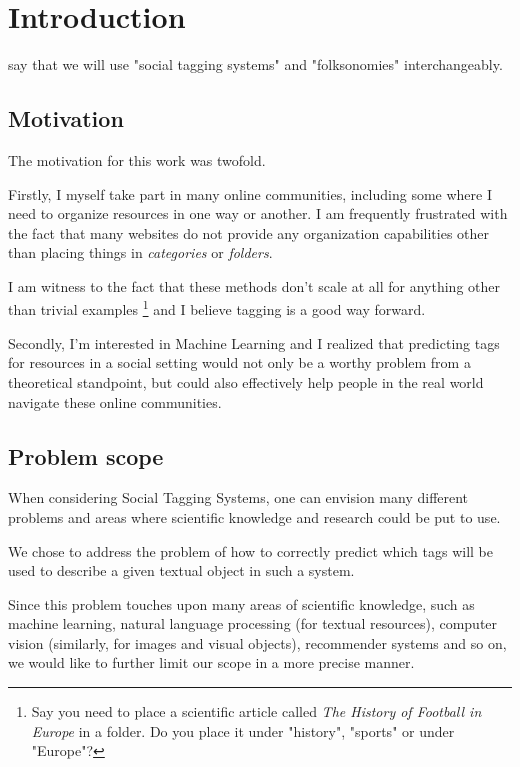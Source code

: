\chapter{Introduction}\label{chap:intro}

say that we will use "social tagging systems" and "folksonomies" interchangeably.

\section{Motivation}\label{section:intro_motivation}

The motivation for this work was twofold. 

Firstly, I myself take part in many online communities, including some where I need to organize resources in one way or another. I am frequently frustrated with the fact that many websites do not provide any organization capabilities other than placing things in \textit{categories} or \textit{folders}.

I am witness to the fact that these methods don't scale at all for anything other than trivial examples \footnote{Say you need to place a scientific article called \textit{The History of Football in Europe} in a folder. Do you place it under "history", "sports" or under "Europe"?} and I believe tagging is a good way forward.

Secondly, I'm interested in Machine Learning and I realized that predicting tags for resources in a social setting would not only be a worthy problem from a theoretical standpoint, but could also effectively help people in the real world navigate these online communities.


\section{Problem scope}\label{section:intro_problem}

When considering Social Tagging Systems, one can envision many different problems and areas where scientific knowledge and research could be put to use.

We chose to address the problem of how to correctly predict which tags will be used to describe a given textual object in such a system. 

Since this problem touches upon many areas of scientific knowledge, such as machine learning, natural language processing (for textual resources), computer vision (similarly, for images and visual objects), recommender systems and so on, we would like to further limit our scope in a more precise manner.

